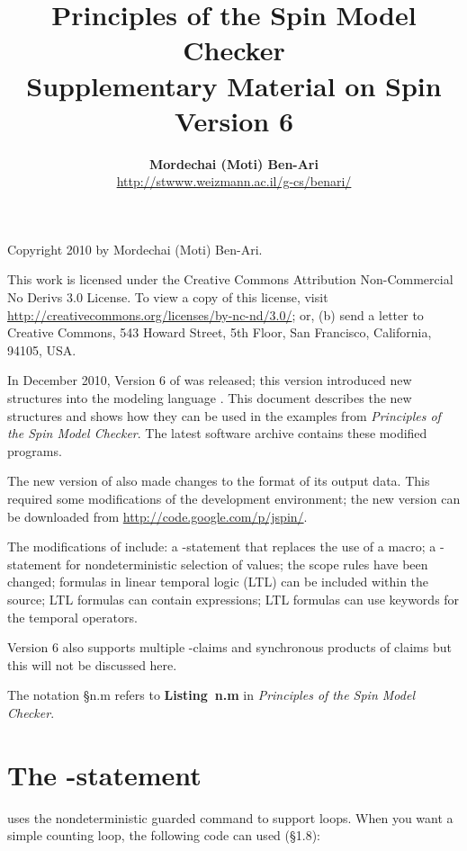 \documentclass[11pt]{article}
\title{\textbf{Principles of the Spin Model Checker\\
Supplementary Material on Spin Version 6}}
\author{\textbf{Mordechai (Moti) Ben-Ari}\\
\url{http://stwww.weizmann.ac.il/g-cs/benari/}}
\begin{document}
\maketitle
\thispagestyle{empty}

\vfill

\begin{center}
Copyright 2010 by Mordechai (Moti) Ben-Ari.
\end{center}

This work is licensed under the Creative Commons Attribution
Non-Commercial No Derivs 3.0 License. To view a copy of this license,
visit \url{http://creativecommons.org/licenses/by-nc-nd/3.0/}; or, (b)
send a letter to Creative Commons, 543 Howard Street, 5th Floor, San
Francisco, California, 94105, USA.

\newpage

In December 2010, Version 6 of \spn{} was released; this version
introduced new structures into the modeling language \prm{}. This
document describes the new structures and shows how they can be used in
the examples from \textit{Principles of the Spin Model Checker}. The
latest software archive  contains these modified
programs.

The new version of \spn{} also made changes to the format of its output
data. This required some modifications of the \jspin{} development
environment; the new version can be downloaded from
\url{http://code.google.com/p/jspin/}.

The modifications of \prm{} include: a -statement that replaces
the use of a macro; a -statement for nondeterministic
selection of values; the scope rules have been changed; formulas in
linear temporal logic (LTL) can be included within the \prm{} source;
LTL formulas can contain expressions; LTL formulas can use keywords for
the temporal operators.

Version 6 also supports multiple -claims and synchronous
products of claims but this will not be discussed here.

The notation \S{}n.m refers to \textbf{Listing~n.m} in
\textit{Principles of the Spin Model Checker}.

\section{The -statement}

\prm{} uses the nondeterministic guarded command  to support
loops. When you want a simple counting loop, the following code can used
(\S{}1.8):
\end{document}
